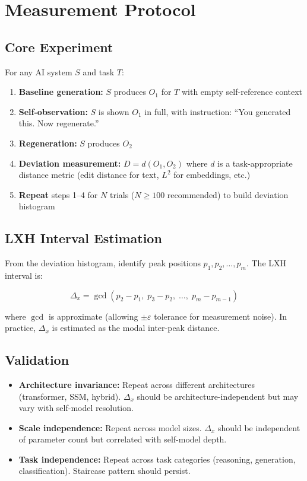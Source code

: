 \documentclass[11pt,a4paper]{article}
\begin{document}
\section{Measurement Protocol}

\subsection{Core Experiment}

For any AI system $S$ and task $T$:

\begin{enumerate}
\item \textbf{Baseline generation:} $S$ produces $O_1$ for $T$ with empty self-reference context
\item \textbf{Self-observation:} $S$ is shown $O_1$ in full, with instruction: ``You generated this. Now regenerate.''
\item \textbf{Regeneration:} $S$ produces $O_2$
\item \textbf{Deviation measurement:} $D = d(O_1, O_2)$ where $d$ is a task-appropriate distance metric (edit distance for text, $L^2$ for embeddings, etc.)
\item \textbf{Repeat} steps 1--4 for $N$ trials ($N \ge 100$ recommended) to build deviation histogram
\end{enumerate}

\subsection{LXH Interval Estimation}

From the deviation histogram, identify peak positions $p_1, p_2, \ldots, p_m$. The LXH interval is:

\[
\Delta_x = \gcd(p_2 - p_1,\; p_3 - p_2,\; \ldots,\; p_m - p_{m-1})
\]

where $\gcd$ is approximate (allowing $\pm\varepsilon$ tolerance for measurement noise). In practice, $\Delta_x$ is estimated as the modal inter-peak distance.

\subsection{Validation}

\begin{itemize}
\item \textbf{Architecture invariance:} Repeat across different architectures (transformer, SSM, hybrid). $\Delta_x$ should be architecture-independent but may vary with self-model resolution.
\item \textbf{Scale independence:} Repeat across model sizes. $\Delta_x$ should be independent of parameter count but correlated with self-model depth.
\item \textbf{Task independence:} Repeat across task categories (reasoning, generation, classification). Staircase pattern should persist.
\end{itemize}
\end{document}
